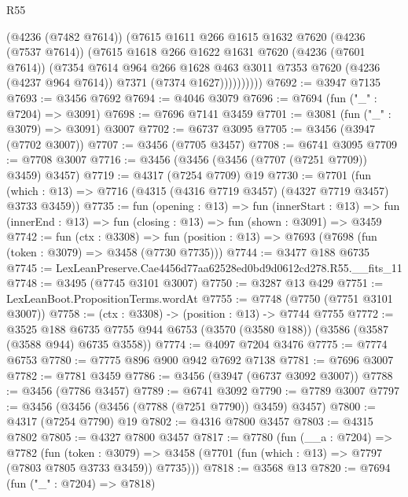 \begin{lexlean}{R55}
\begin{coremodule}
                (@4236 (@7482 @7614))
                (@7615
                  @1611
                  @266
                  @1615
                  @1632
                  @7620
                  (@4236 (@7537 @7614))
                  (@7615
                    @1618
                    @266
                    @1622
                    @1631
                    @7620
                    (@4236 (@7601 @7614))
                    (@7354
                      @7614
                      @964
                      @266
                      @1628
                      @463
                      @3011
                      @7353
                      @7620
                      (@4236 (@4237 @964 @7614))
                      @7371
                      (@7374 @1627))))))))))
@7692 := @3947 @7135
@7693 := @3456 @7692
@7694 := @4046 @3079
@7696 := @7694 (fun ("_" : @7204) => @3091)
@7698 := @7696 @7141 @3459
@7701 := @3081 (fun ("_" : @3079) => @3091) @3007
@7702 := @6737 @3095
@7705 := @3456 (@3947 (@7702 @3007))
@7707 := @3456 (@7705 @3457)
@7708 := @6741 @3095
@7709 := @7708 @3007
@7716 := @3456 (@3456 (@3456 (@7707 (@7251 @7709)) @3459) @3457)
@7719 := @4317 (@7254 @7709) @19
@7730 := @7701
    (fun (which : @13) => @7716 (@4315 (@4316 @7719 @3457) (@4327 @7719 @3457) @3733 @3459))
@7735 := fun (opening : @13) =>
  fun (innerStart : @13) =>
  fun (innerEnd : @13) => fun (closing : @13) => fun (shown : @3091) => @3459
@7742 := fun (ctx : @3308) =>
  fun (position : @13) => @7693 (@7698 (fun (token : @3079) => @3458 (@7730 @7735)))
@7744 := @3477 @188 @6735
@7745 := LexLeanPreserve.Cae4456d77aa62528ed0bd9d0612cd278.R55.__fits_11
@7748 := @3495 (@7745 @3101 @3007)
@7750 := @3287 @13 @429
@7751 := LexLeanBoot.PropositionTerms.wordAt
@7755 := @7748 (@7750 (@7751 @3101 @3007))
@7758 := (ctx : @3308) -> (position : @13) -> @7744 @7755
@7772 := @3525
    @188
    @6735
    @7755
    @944
    @6753
    (@3570 (@3580 @188))
    (@3586 (@3587 (@3588 @944) @6735 @3558))
@7774 := @4097 @7204 @3476
@7775 := @7774 @6753
@7780 := @7775 @896 @900 @942 @7692 @7138
@7781 := @7696 @3007
@7782 := @7781 @3459
@7786 := @3456 (@3947 (@6737 @3092 @3007))
@7788 := @3456 (@7786 @3457)
@7789 := @6741 @3092
@7790 := @7789 @3007
@7797 := @3456 (@3456 (@3456 (@7788 (@7251 @7790)) @3459) @3457)
@7800 := @4317 (@7254 @7790) @19
@7802 := @4316 @7800 @3457
@7803 := @4315 @7802
@7805 := @4327 @7800 @3457
@7817 := @7780
    (fun (__a : @7204) =>
    @7782
      (fun (token : @3079) =>
      @3458 (@7701 (fun (which : @13) => @7797 (@7803 @7805 @3733 @3459)) @7735)))
@7818 := @3568 @13
@7820 := @7694 (fun ("_" : @7204) => @7818)

\end{coremodule}
\end{lexlean}
